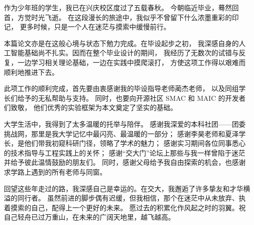 %
%
%
%
%
%
%
%

作为少年班的学生，我已在兴庆校区度过了五载春秋。
今朝临近毕业，蓦然回首，方觉时光飞逝。
在这段漫长的旅途中，我似乎不曾留下什么浓墨重彩的印记，
更多时候，只是一个人在迷茫与摸索中缓慢前行。

本篇论文亦是在这般心境与状态下勉力完成。在毕设起步之初，
我深感自身的人工智能基础尚不扎实。因而在整个毕业设计的期间，
我经历了无数次的试错与反复，一边学习相关理论基础，一边在实践中摸爬滚打，
方使这项工作得以艰难而顺利地推进下去。

此项工作的顺利完成，首先要由衷感谢我的毕设指导老师蔺杰老师，
以及同组学长们给予的无私帮助与支持。
同时，也要向开源社区 SMAC 和 MAIC 的开发者们致敬，
他们优秀的实验框架为本文奠定了坚实的基础。

大学生活中，我得到了太多温暖的托举与陪伴。
感谢我深爱的本科社团——团委挑战网，那里是我大学记忆中最闪亮、最温暖的一部分；
感谢李昊老师和夏泽学长，是他们带我初窥科研门径，领略了学术的魅力；
感谢实习期间各位同事悉心的技术指导与工程实践上的关怀；
感谢“交大门”论坛上那些与我一样曾陷于迷茫并给予彼此温情鼓励的朋友们。
同时，感谢父母给予我自由探索的机会，也感谢求学路上遇到的所有老师与同窗。

回望这些年走过的路，我深感自己是幸运的。在交大，我邂逅了许多挚友和才华横溢的同行者。
虽然前进的脚步偶有迟缓，但我相信，那个在迷茫中从未放弃、执着摸索的自己，配得上一个更好的未来。
愿过去的积累化作风起之时的羽翼。祝自己轻舟已过万重山，在未来的广阔天地里，越飞越高。